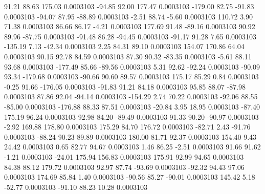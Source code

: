        91.21       88.63      175.03     0.0003103
      -94.85       92.00      177.47     0.0003103
     -179.00       82.75      -91.83     0.0003103
      -94.07       87.95      -88.89     0.0003103
       -2.51       88.74       -5.60     0.0003103
      110.72        3.90       71.38     0.0003103
       86.66       86.17       -4.21     0.0003103
      177.69       91.48      -89.16     0.0003103
       90.92       89.96      -87.75     0.0003103
      -91.48       86.28      -94.45     0.0003103
      -91.17       91.28        7.65     0.0003103
     -135.19        7.13      -42.34     0.0003103
        2.25       84.31       89.10     0.0003103
      154.07      170.86       64.04     0.0003103
       90.15       92.78       84.59     0.0003103
       87.30       90.32      -83.35     0.0003103
       -5.61       88.11       93.68     0.0003103
     -177.49       85.66      -89.56     0.0003103
        5.31       92.62      -92.24     0.0003103
      -90.09       93.34     -179.68     0.0003103
      -90.66       90.60       89.57     0.0003103
      175.17       85.29        0.84     0.0003103
       -0.25       91.66     -176.05     0.0003103
      -91.83       91.21       84.18     0.0003103
       95.85       88.07      -87.98     0.0003103
       87.86       92.04      -94.14     0.0003103
     -154.29        2.74       70.22     0.0003103
      -92.06       88.55      -85.00     0.0003103
     -176.88       88.33       87.51     0.0003103
      -20.84        3.95       18.95     0.0003103
      -87.40      175.19       96.24     0.0003103
       92.98       84.20      -89.49     0.0003103
       91.33       90.20      -90.97     0.0003103
       -2.92      169.88      178.80     0.0003103
      175.29       84.70      176.72     0.0003103
      -82.71        2.43      -91.76     0.0003103
      -88.24       90.23       89.89     0.0003103
      180.00       81.71       92.37     0.0003103
      154.40        9.43       24.42     0.0003103
        0.65       82.77       94.67     0.0003103
        1.46       86.25       -2.51     0.0003103
       91.66       91.62       -1.21     0.0003103
      -24.01      175.94      156.83     0.0003103
      175.91       92.99       94.65     0.0003103
       84.38       88.12      179.72     0.0003103
       92.97       87.74      -93.69     0.0003103
      -92.32       94.43       97.06     0.0003103
      174.69       85.84        1.40     0.0003103
      -90.56       85.27      -90.01     0.0003103
      145.42        5.18      -52.77     0.0003103
      -91.10       88.23       10.28     0.0003103

